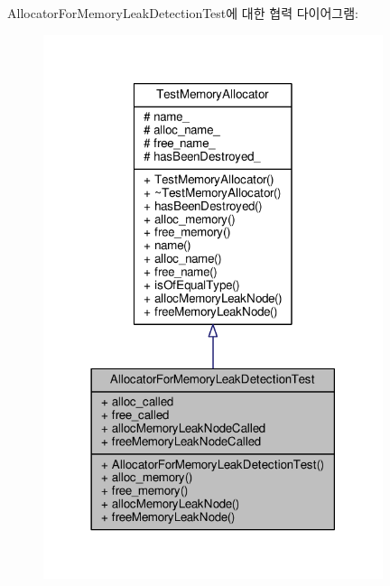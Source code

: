 Allocator\+For\+Memory\+Leak\+Detection\+Test에 대한 협력 다이어그램\+:
\nopagebreak
\begin{figure}[H]
\begin{center}
\leavevmode
\includegraphics[width=282pt]{class_allocator_for_memory_leak_detection_test__coll__graph}
\end{center}
\end{figure}
